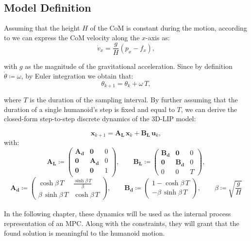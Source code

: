 \documentclass[main.tex]{subfiles}
\begin{document}
\subsection{Model Definition}
Assuming that the height $H$ of the CoM is constant during the motion, according to \cite{peng_main_paper} we can express the CoM velocity along the $x$-axis as:
$$
\dot{v}_x = \frac{g}{H}\left(p_x - f_x\right),
$$

with $g$ as the magnitude of the gravitational acceleration. Since by definition $\dot{\theta} \coloneqq \omega$, by Euler integration we obtain that:
$$
\theta_{k+1} = \theta_k + \omega \, T,
$$

where $T$ is the duration of the sampling interval. By further assuming that the duration of a single humanoid's step is fixed and equal to $T$, we can derive the closed-form step-to-step discrete dynamics of the 3D-LIP model:

\begin{equation}\label{eq:lip_dyanmics}
\mathbf{x}_{k+1} = \mathbf{A_L} \, \mathbf{x}_k + \mathbf{B_L} \, \mathbf{u}_k,
\end{equation}
with:
$$
\mathbf{A_L} \coloneqq 
\begin{pmatrix}
\mathbf{A_d} & \mathbf{0} & 0 \\
\mathbf{0} & \mathbf{A_d} & 0 \\
\mathbf{0} & \mathbf{0} & 1 \\
\end{pmatrix}, \qquad
\mathbf{B_L} \coloneqq 
\begin{pmatrix}
\mathbf{B_d} & \mathbf{0} & 0 \\
\mathbf{0} & \mathbf{B_d} & 0 \\
0 & 0 & T
\end{pmatrix},
$$
$$
\mathbf{A_d} \coloneqq 
\begin{pmatrix}
\cosh{\beta \, T} & \frac{\sinh{\beta \, T}}{\beta}  \\
\beta \, \sinh{\beta \, T} & \cosh{\beta \, T}
\end{pmatrix}, \qquad
\mathbf{B_d} \coloneqq 
\begin{pmatrix}
1 - \cosh{\beta \, T} \\
-\beta \, \sinh{\beta \, T}
\end{pmatrix}, \qquad
\beta \coloneqq \sqrt{\frac{g}{H}}
$$
\\
In the following chapter, these dynamics will be used as the internal process representation of an MPC. Along with the constraints, they will grant that the found solution is meaningful to the humanoid motion.
\end{document}
